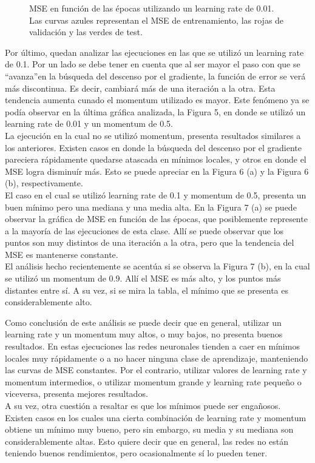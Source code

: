 \documentclass[12pt, a4paper]{article}
\begin{document}
\begin{figure}
    \caption{MSE en función de las épocas utilizando un learning rate de 0.01. Las curvas azules representan el MSE de entrenamiento, las rojas de validación y las verdes de test.}
\end{figure}

\bigskip

Por último, quedan analizar las ejecuciones en las que se utilizó un learning rate de 0.1. Por un lado se debe tener en cuenta que al ser mayor el paso con que se \textquotedblleft avanza\textquotedblright en la búsqueda del descenso por el gradiente, la función de error se verá más discontinua. Es decir, cambiará más de una iteración a la otra. Esta tendencia aumenta cunado el momentum utilizado es mayor. Este fenómeno ya se podía observar en la última gráfica analizada, la Figura 5, en donde se utilizó un learning rate de 0.01 y un momentum de 0.5.\\
La ejecución en la cual no se utilizó momentum, presenta resultados similares a los anteriores. Existen casos en donde la búsqueda del descenso por el gradiente pareciera rápidamente quedarse atascada en mínimos locales, y otros en donde el MSE logra disminuír más. Esto se puede apreciar en la Figura 6 (a) y la Figura 6 (b), respectivamente.\\
El caso en el cual se utilizó learning rate de 0.1 y momentum de 0.5, presenta un buen mínimo pero una mediana y una media alta. En la Figura 7 (a) se puede observar la gráfica de MSE en función de las épocas, que posiblemente represente a la mayoría de las ejecuciones de esta clase. Allí se puede observar que los puntos son muy distintos de una iteración a la otra, pero que la tendencia del MSE es mantenerse constante.\\
El análisis hecho recientemente se acentúa si se observa la Figura 7 (b), en la cual se utilizó un momentum de 0.9. Allí el MSE es más alto, y los puntos más distantes entre sí. A su vez, si se mira la tabla, el mínimo que se presenta es considerablemente alto.

\bigskip
Como conclusión de este análisis se puede decir que en general, utilizar un learning rate y un momentum muy altos, o muy bajos, no presenta buenos resultados. En estas ejecuciones las redes neuronales tienden a caer en mínimos locales muy rápidamente o a no hacer ninguna clase de aprendizaje, manteniendo las curvas de MSE constantes. Por el contrario, utilizar valores de learning rate y momentum intermedios, o utilizar momentum grande y learning rate pequeño o viceversa, presenta mejores resultados.\\
A su vez, otra cuestión a resaltar es que los mínimos puede ser engañosos. Existen casos en los cuales una cierta combinación de learning rate y momentum obtiene un mínimo muy bueno, pero sin embargo, su media y su mediana son considerablemente altas. Esto quiere decir que en general, las redes no están teniendo buenos rendimientos, pero ocasionalmente sí lo pueden tener.
\end{document}
